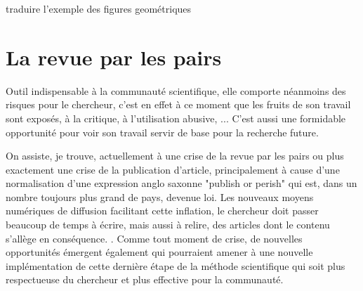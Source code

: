 

traduire l'exemple des figures geométriques



\section{La revue par les pairs} \label{sec:pairs}

Outil indispensable à la communauté scientifique, elle comporte néanmoins des risques pour le chercheur, c'est en effet à ce moment que les fruits de son travail sont exposés, à la critique, à l'utilisation abusive, ... C'est aussi une formidable opportunité pour voir son travail servir de base pour la recherche future.

On assiste, je trouve, actuellement à une \og crise \fg de la revue par les pairs ou plus exactement une crise de la publication d'article, principalement à cause d'une normalisation d'une expression anglo saxonne "publish or perish" qui est, dans un nombre toujours plus grand de pays, devenue loi. Les nouveaux moyens numériques de diffusion facilitant cette inflation, le chercheur doit passer beaucoup de temps à écrire, mais aussi à relire, des articles dont le contenu s'allège en conséquence. . Comme tout moment de crise, de nouvelles opportunités émergent également qui pourraient amener à une nouvelle implémentation de cette dernière étape de la méthode scientifique qui soit plus respectueuse du chercheur et plus effective pour la communauté. 

